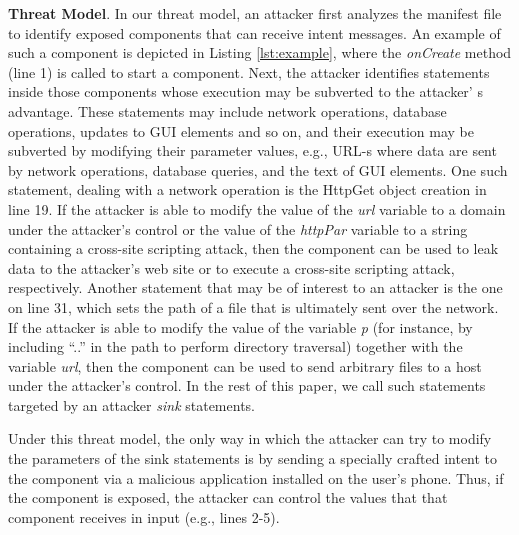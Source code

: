 \textbf{Threat Model}. In our threat model, an attacker first analyzes the manifest file to identify exposed components that can receive intent messages. An example of such a component is depicted in Listing \ref{lst:example}, where the \textit{onCreate} method (line 1) is called to start a component. Next, the attacker identifies statements inside those components whose execution may be subverted to the attacker' s advantage. These statements may include network operations, database operations, updates to GUI elements and so on, and their execution may be subverted by modifying their parameter values, e.g., URL-s where data are sent by network operations, database queries, and the text of GUI elements. One such statement, dealing with a network operation is the HttpGet object creation in line 19. If the attacker is able to modify the value of the \textit{url} variable to a domain under the attacker's control or the value of the \textit{httpPar} variable to a string containing a cross-site scripting attack, then the component can be used to leak data to the attacker's web site or to execute a cross-site scripting attack, respectively. Another statement that may be of interest to an attacker is the one on line 31, which sets the path of a file that is ultimately sent over the network. If the attacker is able to modify the value of the variable \textit{p} (for instance, by including ``..'' in the path to perform directory traversal) together with the variable \textit{url}, then the component can be used to send arbitrary files to a host under the attacker's control. 
In the rest of this paper, we call such statements targeted by an attacker \textit{sink} statements.

Under this threat model, the only way in which the attacker can try to modify the parameters of the sink statements is by sending a specially crafted intent to the component via a malicious application installed on the user's phone. Thus, if the component is exposed, the attacker can control the values that that component receives in input (e.g., lines 2-5).

